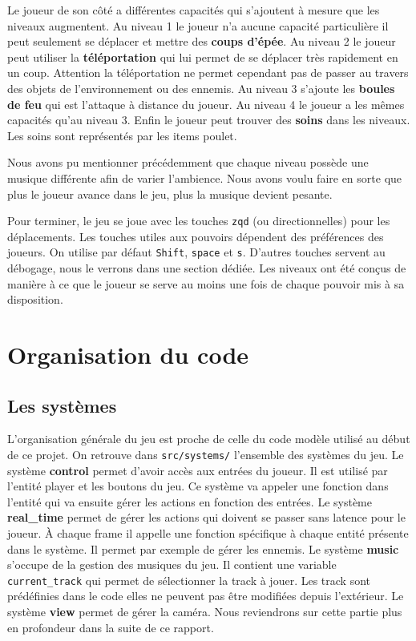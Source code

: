 \documentclass{article}
\begin{document}
Le joueur de son côté a différentes capacités qui s'ajoutent à mesure que les niveaux augmentent. Au niveau 1 le 
joueur n'a aucune capacité particulière il peut seulement se déplacer et mettre des \textbf{coups d'épée}. Au niveau 2 
le joueur peut utiliser la \textbf{téléportation} qui lui permet de se déplacer très rapidement en un coup. 
Attention la téléportation ne permet cependant pas de passer au travers des objets de l'environnement ou des 
ennemis. Au niveau 3 s'ajoute les \textbf{boules de feu} qui est l'attaque à distance du joueur. Au niveau 4 le 
joueur a les mêmes capacités qu'au niveau 3. Enfin le joueur peut trouver des \textbf{soins} dans les niveaux. 
Les soins sont représentés par les items poulet.

Nous avons pu mentionner précédemment que chaque niveau possède une musique 
différente afin de varier l'ambience. Nous avons voulu faire en sorte que plus le joueur avance dans le jeu,
 plus la musique devient pesante.

Pour terminer, le jeu se joue avec les touches \verb|zqd| (ou directionnelles) pour les déplacements. Les 
touches utiles aux pouvoirs dépendent des préférences des joueurs. On utilise par défaut \verb|Shift|, 
\verb|space| et \verb|s|. D'autres touches servent au débogage, nous le verrons dans une section dédiée. 
Les niveaux ont été conçus de manière à ce que le joueur se serve au moins une fois de chaque pouvoir 
mis à sa disposition.

\section{Organisation du code}

\subsection{Les systèmes}

L'organisation générale du jeu est proche de celle du code modèle utilisé au début de ce projet.
On retrouve dans \verb|src/systems/| l'ensemble des systèmes du jeu. Le système \textbf{control} permet 
d'avoir accès aux entrées du joueur. Il est utilisé par l'entité player et les boutons du jeu. Ce 
système va appeler une fonction dans l'entité qui va ensuite gérer les actions en fonction des entrées.
Le système \textbf{real\_time} permet de gérer les actions qui doivent se passer sans latence pour le joueur.
À chaque frame il appelle une fonction spécifique à chaque entité présente dans le système. Il permet par exemple
de gérer les ennemis. Le système \textbf{music} s'occupe de la gestion des musiques du jeu. Il contient une 
variable \verb|current_track| qui permet de sélectionner la track à jouer. Les track sont prédéfinies dans le code 
elles ne peuvent pas être modifiées depuis l'extérieur. Le système \textbf{view} permet de gérer la caméra. Nous 
reviendrons sur cette partie plus en profondeur dans la suite de ce rapport.
\end{document}
